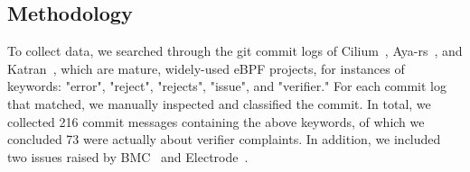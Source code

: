 
\subsection{Methodology}
To collect data, we searched through the git commit logs of Cilium~\cite{cilium}, Aya-rs~\cite{aya-rs}, and
    Katran~\cite{katran}, which are mature, widely-used eBPF projects, for instances of
    keywords: "error", "reject", "rejects", "issue", and "verifier."
For each commit log that matched, we manually inspected and classified the commit.
In total, we collected 216 commit messages containing the above keywords, of which we concluded 73 were actually about verifier complaints.
In addition, we included two issues raised by BMC~\cite{BMC} and Electrode~\cite{Electrode}. %




